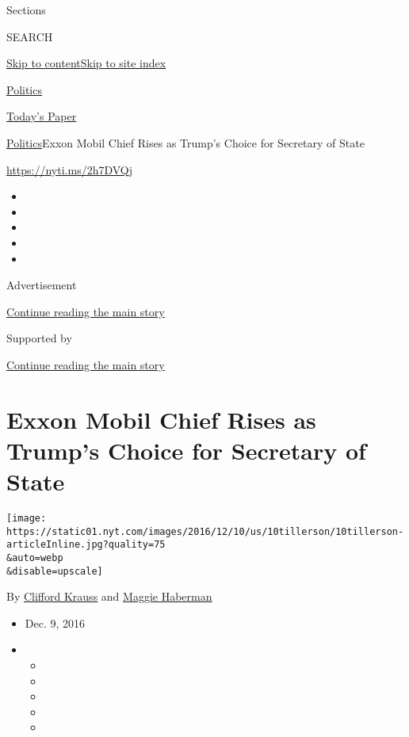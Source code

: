 Sections

SEARCH

\protect\hyperlink{site-content}{Skip to
content}\protect\hyperlink{site-index}{Skip to site index}

\href{https://www.nytimes.com/section/politics}{Politics}

\href{https://myaccount.nytimes.com/auth/login?response_type=cookie\&client_id=vi}{}

\href{https://www.nytimes.com/section/todayspaper}{Today's Paper}

\href{/section/politics}{Politics}\textbar{}Exxon Mobil Chief Rises as
Trump's Choice for Secretary of State

\url{https://nyti.ms/2h7DVQj}

\begin{itemize}
\item
\item
\item
\item
\item
\end{itemize}

Advertisement

\protect\hyperlink{after-top}{Continue reading the main story}

Supported by

\protect\hyperlink{after-sponsor}{Continue reading the main story}

\hypertarget{exxon-mobil-chief-rises-as-trumps-choice-for-secretary-of-state}{%
\section{Exxon Mobil Chief Rises as Trump's Choice for Secretary of
State}\label{exxon-mobil-chief-rises-as-trumps-choice-for-secretary-of-state}}

\texttt{[image: https://static01.nyt.com/images/2016/12/10/us/10tillerson/10tillerson-articleInline.jpg?quality=75\\\&auto=webp\\\&disable=upscale]}

By \href{http://www.nytimes.com/by/clifford-krauss}{Clifford Krauss} and
\href{http://www.nytimes.com/by/maggie-haberman}{Maggie Haberman}

\begin{itemize}
\item
  Dec. 9, 2016
\item
  \begin{itemize}
  \item
  \item
  \item
  \item
  \item
  \end{itemize}
\end{itemize}

